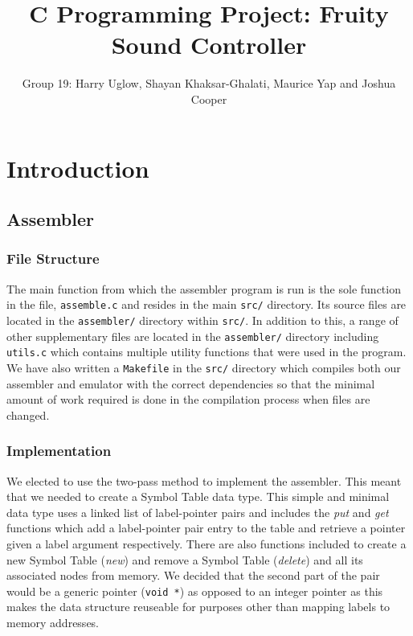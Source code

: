 \documentclass[11pt]{article}
\begin{document}
\sloppy
\title{C Programming Project: Fruity Sound Controller}
\author{Group 19: Harry Uglow, Shayan Khaksar-Ghalati, Maurice Yap and Joshua Cooper}

\maketitle

\section{Introduction}

\subsection{Assembler}
\subsubsection{File Structure}
The main function from which the assembler program is run is the sole function in the file, \texttt{assemble.c} and resides in the main \texttt{src/} directory. Its source files are located in the \texttt{assembler/} directory within \texttt{src/}. In addition to this, a range of other supplementary files are located in the \texttt{assembler/} directory including \texttt{utils.c} which contains multiple utility functions that were used in the program. We have also written a \texttt{Makefile} in the \texttt{src/} directory which compiles both our assembler and emulator with the correct dependencies so that the minimal amount of work required is done in the compilation process when files are changed.
\subsubsection{Implementation}
We elected to use the two-pass method to implement the assembler. This meant that we needed to create a Symbol Table data type. This simple and minimal data type uses a linked list of label-pointer pairs and includes the \textit{put} and \textit{get} functions which add a label-pointer pair entry to the table and retrieve a pointer given a label argument respectively. There are also functions included to create a new Symbol Table (\textit{new}) and remove a Symbol Table (\textit{delete}) and all its associated nodes from memory. We decided that the second part of the pair would be a generic pointer (\texttt{void *}) as opposed to an integer pointer as this makes the data structure reuseable for purposes other than mapping labels to memory addresses.\\
\end{document}
